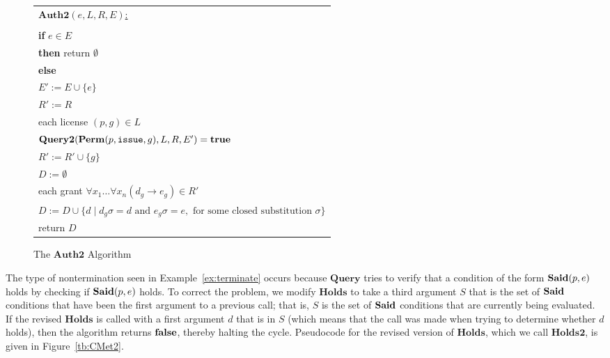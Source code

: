\documentclass{acmtrans2m}
\newcommand{\<}{
}
\renewcommand{\>}{\rangle}
\newcommand{\union}{\cup}
\newcommand{\Said}{\mathit{\bf Said}}
\newcommand{\true}{\mathit{\bf{true}}}
\newcommand{\false}{\mathit{\bf{false}}}
\newcommand{\Permitted}{\mathit{\bf Perm}}
\newcommand{\vtab}{\phantom{Le}}
\newcommand{\cd}{d}
\newcommand{\cc}{e}
\newcommand{\scc}{E}
\newcommand{\issue}{\mathtt{issue}}
\newcommand{\imp}{\rightarrow}
\newcommand{\CMet}{\textbf{Holds}}
\newcommand{\XProc}{\textbf{Query}}
\newcommand{\XProcTwo}{\textbf{Query2}}
\newcommand{\CMetTwo}{\textbf{Holds2}}
\newcommand{\XATwo}{\textbf{Auth2}}
\begin{document}
\begin{figure*}[htb]
\begin{center}
\begin{tabular}{|l|}\hline
\underline{$\XATwo(\cc, L, R, \scc)$:}\\\\
{\bf if} $\cc\in\scc$\\
{\bf then} return $\emptyset$\\
{\bf else}\\
\vtab $\scc' := \scc \union \{\cc\}$\\
\vtab $R' := R$\\
\vtab {\bf for} each license $(p, g) \in L$\\
\vtab\vtab {\bf if} $\XProcTwo(\Permitted(p, \issue, g), L, R, \scc') = \true$\\
\vtab\vtab {\bf then} $R' := R'\union \{g\}$\\
\vtab $D := \emptyset$\\
\vtab{\bf for} each grant $\forall x_1 \ldots \forall x_n(\cd_g\imp\cc_g) \in R'$\\
\vtab\vtab $D := D \union\{\cd\mid\cd_g\sigma = \cd\mbox{ and }  \cc_g\sigma = \cc,
\mbox{ for some closed substitution }\sigma\}$\\
\vtab return $D$\\
\hline
\end{tabular}
\end{center}
\caption{The $\XATwo$ Algorithm}
\label{tb:auth2}
\end{figure*}

The type of nontermination seen in Example~\ref{ex:terminate} occurs because $\XProc$ tries to verify
that a condition of the form $\Said(p, \cc)$ holds by checking if $\Said(p, \cc)$ holds.  To correct
the problem, we modify $\CMet$ to take a third argument $S$ that is the set of $\Said$ conditions that
have been the first argument to a previous call; that is, $S$ is the set of $\Said$ conditions that
are currently being evaluated.  If the revised $\CMet$ is called with a first argument $\cd$ that is
in $S$ (which means that the call was made when trying to determine whether $\cd$ holds), then the
algorithm returns $\false$, thereby halting the cycle.  Pseudocode for the revised version of $\CMet$,
which we call $\CMetTwo$, is given in Figure~\ref{tb:CMet2}.
\end{document}
